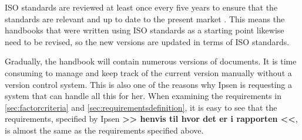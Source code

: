 ISO standards are reviewed at least once every five years to ensure that the standards are relevant and up to date to the present market \cite{ISOreviewedevery5years}.
This means the handbooks that were written using ISO standards as a starting point likewise need to be revised, so the new versions are updated in terms of ISO standards.

Gradually, the handbook will contain numerous versions of documents.
It is time consuming to manage and keep track of the current version manually without a version control system.
This is also one of the reasons why Ipsen is requesting a system that can handle all this for her.
When examining the requirements in \cref{sec:factorcriteria} and \cref{sec:requirementsdefinition}, it is easy to see that the requirements, specified by Ipsen {\color{red}\textbf{>> henvis til hvor det er i rapporten <<}}, is almost the same as the requirements specified above.

